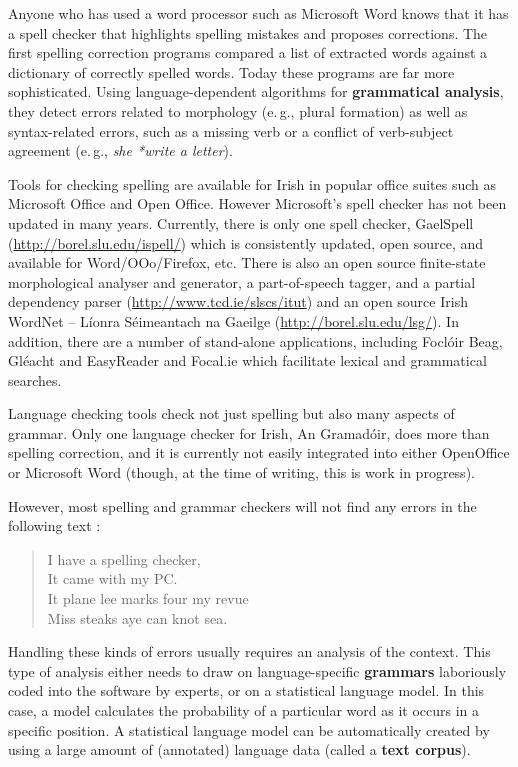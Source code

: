 \begin{multicols}{2}
Anyone who has used a word processor such as Microsoft Word knows that it has a spell checker that highlights spelling mistakes and proposes corrections. The first spelling correction programs compared a list of extracted words against a dictionary of correctly spelled words. Today these programs are far more sophisticated. Using language-dependent algorithms for \textbf{grammatical analysis}, they detect errors related to morphology (e.\,g., plural formation) as well as syntax-related errors, such as a missing verb or a conflict of verb-subject agreement (e.\,g., \textit{she *write a letter}). 

Tools for checking spelling are available for Irish in popular office suites such as Microsoft Office and Open Office. However Microsoft's spell checker has not been updated in many years. Currently, there is only one spell checker, GaelSpell (\url{http://borel.slu.edu/ispell/}) which is consistently updated, open source, and available for Word/OOo/Firefox, etc. There is also an open source finite-state morphological analyser and generator, a part-of-speech tagger, and a partial dependency parser (\url{http://www.tcd.ie/slscs/itut}) and an open source Irish WordNet -- Líonra Séimeantach na Gaeilge  (\url{http://borel.slu.edu/lsg/}). In addition, there are a number of stand-alone applications, including Foclóir Beag, Gléacht and EasyReader and Focal.ie which facilitate lexical and grammatical searches. 

Language checking tools check not just spelling but also many aspects of grammar. Only one language checker for Irish, An Gramadóir,  \cite{gramadoir} does more than spelling correction, and it is currently not easily integrated into either OpenOffice or Microsoft Word (though, at the time of writing, this is work in progress).


However, most spelling and grammar checkers will not find any errors in the following text \cite{zar1}:

\begin{quote}
  I have a spelling checker,\\
  It came with my PC.\\
  It plane lee marks four my revue\\
  Miss steaks aye can knot sea.
\end{quote}

Handling these kinds of errors usually requires an analysis of the context. This type of analysis either needs to draw on language-specific \textbf{grammars} laboriously coded into the software by experts, or on a statistical language model. In this case, a model calculates the probability of a particular word as it occurs in a specific position. A statistical language model can be automatically created by using a large amount of (annotated) language data (called a \textbf{text corpus}). 


\end{multicols}

